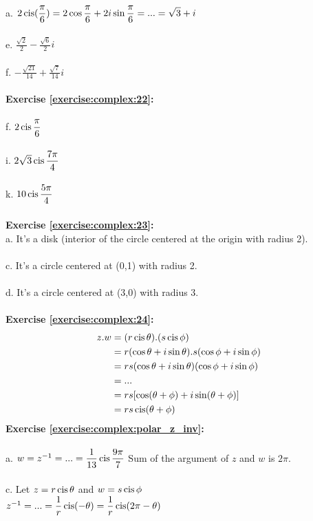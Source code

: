 \\
a. $2\operatorname{cis}(\displaystyle\frac{\pi}{6})=2\cos\frac{\pi}{6}+2i\sin\frac{\pi}{6}=...=\sqrt{3}+i$\\
\\
e. $\displaystyle\frac{\sqrt{2}}{2}-\frac{\sqrt{6}}{2}i$\\
\\
f. $-\displaystyle\frac{\sqrt{21}}{14}+\frac{\sqrt{7}}{14}i$\\
\\
\textbf{Exercise \ref{exercise:complex:22}:}\\
\\
f. $2\operatorname{cis}\displaystyle\frac{\pi}{6}$\\
\\
i. $2\sqrt{3}\operatorname{cis}\displaystyle\frac{7\pi}{4}$\\
\\
k. $10\operatorname{cis}\displaystyle\frac{5\pi}{4}$\\
\\
\textbf{Exercise \ref{exercise:complex:23}:}\\
a. It's a disk (interior of the circle centered at the origin with radius 2).\\
\\
c. It's a circle centered at (0,1) with radius 2.\\
\\
d. It's a circle centered at (3,0) with radius 3.\\
\\
\textbf{Exercise \ref{exercise:complex:24}:}
\begin{align*}
z.w & = (r\operatorname{cis}\theta).(s\operatorname{cis}\phi)\\
&= r(\cos\theta+i\sin\theta).s(\cos\phi+i\sin\phi)\\
&= rs(\cos\theta+i\sin\theta)(\cos\phi+i\sin\phi)\\
&= ...\\
&= rs[\cos(\theta+\phi)+i\sin(\theta+\phi)]\\
&= rs\operatorname{cis}(\theta+\phi)
\end{align*}
\textbf{Exercise \ref{exercise:complex:polar_z_inv}:}\\
\\
a. $w=z^{-1}=...=\displaystyle\frac{1}{13}\operatorname{cis}\frac{9\pi}{7}$
Sum of the argument of $z$ and $w$ is $2\pi$.\\
\\
c. Let $z=r\operatorname{cis}\theta$ and $w=s\operatorname{cis}\phi$\\
$z^{-1}=...=\displaystyle\frac{1}{r}\operatorname{cis}(-\theta)=\frac{1}{r}\operatorname{cis}(2\pi-\theta)$\\
